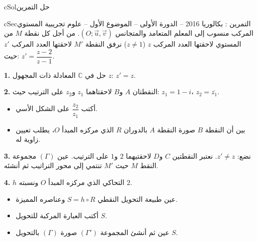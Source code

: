 \documentclass[12pt,a4paper]{article}
\newenvironment{BOX}[2]{\begin{otherlanguage}{english}\begin{arbox}{#1}{#2}}{\end{arbox}\end{otherlanguage}}
\newcounter{exo}
\newenvironment{tamrin}[1]{\stepcounter{exo}\begin{BOX}{cSec}{التمرين \theexo: #1}}{\end{BOX}}
\newenvironment{hal}{\Needspace{12\baselineskip}\begin{otherlanguage}{english}\begin{arbox}[breakable]{cSol}{حل التمرين \theexo}}{\end{arbox}\end{otherlanguage}}
\newenvironment{LTR}{\begin{otherlanguage}{english}}{\end{otherlanguage}}
\newenvironment{sq}{\begin{itemize}[leftmargin=2.4em,itemsep=3pt]}{\end{itemize}}
\newcommand{\qa}{\item[(أ)]}\newcommand{\qb}{\item[(ب)]}\newcommand{\qc}{\item[(جـ)]}\newcommand{\qd}{\item[(د)]}\newcommand{\qe}{\item[(هـ)]}
\newcommand{\QQ}[1]{\par\smallskip\textbf{#1.} }
\begin{document}
\begin{hal}
\begin{center}\begin{LTR}\end{LTR}\end{center}
\end{hal}

\begin{tamrin}{بكالوريا 2016 -- الدورة الأولى -- الموضوع الأول -- علوم تجريبية}
المستوي المركب منسوب إلى المعلم المتعامد والمتجانس $(O;\vec u,\vec v)$. من أجل كل نقطة $M$ من المستوي لاحقتها العدد المركب $z$ ($z\neq1$) نرفق النقطة $M'$ لاحقتها العدد المركب $z'$ حيث: $z'=\dfrac{z-2}{z-1}$.
\QQ{1} حل في $\mathbb{C}$ المعادلة ذات المجهول $z$: $z'=z$.
\QQ{2} النقطتان $A$ و$B$ لاحقتاهما $z_1$ و$z_2$ على الترتيب حيث: $z_1=1-i$، $z_2=\overline{z_1}$.
\begin{sq}
\qa أكتب $\dfrac{z_2}{z_1}$ على الشكل الأسي.
\qb بين أن النقطة $B$ صورة النقطة $A$ بالدوران $R$ الذي مركزه المبدأ $O$، يطلب تعيين زاوية له.
\end{sq}
\QQ{3} نضع: $z'\neq z$. نعتبر النقطتين $C$ و$D$ لاحقتيهما $2$ و$1$ على الترتيب.
عين $(\Gamma)$ مجموعة النقط $M$ حيث $M'$ تنتمي إلى محور التراتيب ثم أنشئه.
\QQ{4} $h$ التحاكي الذي مركزه المبدأ $O$ ونسبته $2$.
\begin{sq}
\qa عين طبيعة التحويل النقطي $S=h\circ R$ وعناصره المميزة.
\qb أكتب العبارة المركبة للتحويل $S$.
\qc عين ثم أنشئ المجموعة $(\Gamma')$ صورة $(\Gamma)$ بالتحويل $S$.
\end{sq}
\end{tamrin}
\end{document}
